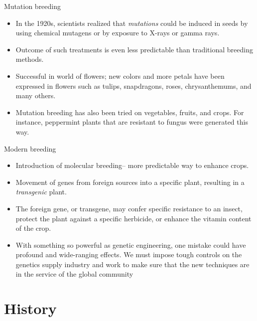 \documentclass[ignorenonframetext,aspectratio=169]{beamer}
\providecommand{\tightlist}{%
  \setlength{\itemsep}{0pt}\setlength{\parskip}{0pt}}
\begin{document}
\begin{frame}{Mutation breeding}
\protect\hypertarget{mutation-breeding}{}

\begin{itemize}
\tightlist
\item
  In the 1920s, scientists realized that \emph{mutations} could be
  induced in seeds by using chemical mutagens or by exposure to X-rays
  or gamma rays.
\item
  Outcome of such treatments is even less predictable than traditional
  breeding methods.
\item
  Successful in world of flowers; new colors and more petals have been
  expressed in flowers such as tulips, snapdragons, roses,
  chrysanthemums, and many others.
\item
  Mutation breeding has also been tried on vegetables, fruits, and
  crops. For instance, peppermint plants that are resistant to fungus
  were generated this way.
\end{itemize}

\end{frame}

\begin{frame}{Modern breeding}
\protect\hypertarget{modern-breeding}{}

\begin{itemize}
\tightlist
\item
  Introduction of molecular breeding-- more predictable way to enhance
  crops.
\item
  Movement of genes from foreign sources into a specific plant,
  resulting in a \emph{transgenic} plant.
\item
  The foreign gene, or transgene, may confer specific resistance to an
  insect, protect the plant against a specific herbicide, or enhance the
  vitamin content of the crop.
\item
  With something so powerful as genetic engineering, one mistake could
  have profound and wide-ranging effects. We must impose tough controls
  on the genetics supply industry and work to make sure that the new
  techniques are in the service of the global community
\end{itemize}

\end{frame}

\hypertarget{history}{%
\section{History}\label{history}}
\end{document}
